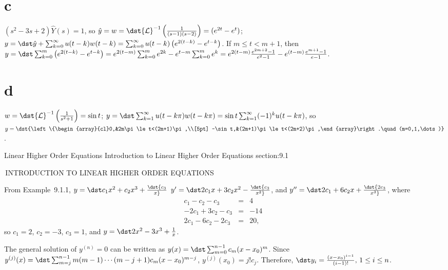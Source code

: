 \documentclass[dvips]{book}
\renewcommand{\exer}[1]{\par\medskip\;\noindent{\color{red}\bf #1.}}
\numberwithin{example}{section}
\numberwithin{equation}{section}
\numberwithin{theorem}{section}
\numberwithin{table}{section}
\numberwithin{figure}{section}
\begin{document}
\part{c}
$(s^2-3s+2)\hat Y(s)=1$, so $\hat y=w=\dst{\cal L}^{-1}\left(1\over
(s-1)(s-2)\right)=(e^{2t}-e^t)$;
$y=\dst\hat y+\sum_{k=0}^\infty u(t-k)w(t-k)=
\sum_{k=0}^\infty u(t-k)\left(e^{2(t-k)}-e^{t-k}\right)$.
If $m\le t< m+1$, then
$y=\dst\sum_{k=0}^m
\left(e^{2(t-k)}-e^{t-k}\right)=
e^{2(t-m)}\sum_{k=0}^me^{2k}-e^{t-m}\sum_{k=0}^me^k=
e^{2(t-m)}{e^{2m+2}-1\over
e^2-1}-e^{(t-m)}{e^{m+1}-1\over e-1}$.

\part{d}
 $w=\dst{\cal L}^{-1}\left(1\over s^2+1\right)=\sin t$;
$y=\dst\sum_{k=1}^\infty u(t-k\pi)w(t-k\pi)=
\sin t\sum_{k=1}^\infty(-1)^k u(t-k\pi)$, so
  $y=\dst{\left\{\begin{array}{cl}0,&2m\pi\le t<(2m+1)\pi,\\[5pt]
-\sin t,&(2m+1)\pi\le t<(2m+2)\pi,\end{array}\right.\quad
(m=0,1,\dots)}$.



\newpage
\thispagestyle{empty}
\setcounter{chapter}{9}

\vspace*{-17.5pt}

 {Linear Higher Order Equations}
{Introduction to Linear Higher Order Equations}
 {section:9.1}

\renewcommand{\thissection}{\sectiontitle
{\,INTRODUCTION TO LINEAR HIGHER ORDER EQUATIONS}}
\thissection

\vspace*{-17.5pt}

\exer{9.1.2} From Example~9.1.1,
$y=\dst c_1x^2+c_2x^3+\dst{c_3\over x}$
$y'=\dst2c_1x+3c_2x^2-\dst{c_3\over x^2}$, and
$y''=\dst2c_1+6c_2x+\dst{2c_3\over x^3}$, where
$$
\begin{array}{rcr}
c_1-c_2-c_3&=&4\phantom{,}\\
-2c_1+3c_2-c_3&=&-14\phantom{,}\\
2c_1-6c_2-2c_3&=&20,
\end{array}
$$
so $c_1=2$, $c_2=-3$, $c_3=1$, and
$y=\dst2x^2-3x^3+{1\over x}$.

\exer{9.1.4} The general solution of $y^{(n)}=0$
can be written as $y(x)=\dst\sum_{m=0}^{n-1}c_m(x-x_0)^m$. Since
$y^{(j)}(x)=\dst\sum_{m=j}^{n-1}m(m-1)\cdots(m-j+1)c_m(x-x_0)^{m-j}$,
$y^{(j)}(x_0)=j!c_j$. Therefore,
$\dst y_i={(x-x_0)^{i-1}\over(i-1)!},\,1\le i
\le n$.
\end{document}
